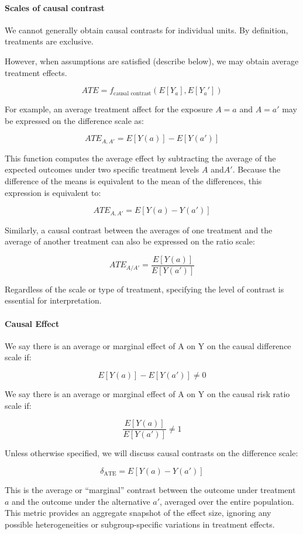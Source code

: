 \documentclass[
  singlecolumn]{article}
\let\oldparagraph\paragraph
\renewcommand{\paragraph}[1]{\oldparagraph{#1}\mbox{}}
\begin{document}
\paragraph{Scales of causal contrast}\label{scales-of-causal-contrast}

We cannot generally obtain causal contrasts for individual units. By
definition, treatments are exclusive.

However, when assumptions are satisfied (describe below), we may obtain
average treatment effects.

\[
ATE = f_{\text{causal contrast}}(E[Y_a], E[Y_a'])
\]

For example, an average treatment affect for the exposure \(A = a\) and
\(A=a'\) may be expressed on the difference scale as:

\[
ATE_{A,A'} = E[Y(a)] - E[Y(a')]
\]

This function computes the average effect by subtracting the average of
the expected outcomes under two specific treatment levels \(A\)
and\(A'\). Because the difference of the means is equivalent to the mean
of the differences, this expression is equivalent to:

\[
ATE_{A,A'} = E[Y(a) - Y(a')]
\]

Similarly, a causal contrast between the averages of one treatment and
the average of another treatment can also be expressed on the ratio
scale:

\[
ATE_{A/A'} = \frac{E[Y(a)]}{E[Y(a')]}
\]

Regardless of the scale or type of treatment, specifying the level of
contrast is essential for interpretation.

\paragraph{Causal Effect}\label{causal-effect}

We say there is an average or marginal effect of A on Y on the causal
difference scale if:

\[ {E}[Y(a)] -  {E}[Y(a')] \neq 0\]

We say there is an average or marginal effect of A on Y on the causal
risk ratio scale if:

\[\frac{ {E}[Y(a)]}{ {E}[Y(a')]}\neq 1\]

Unless otherwise specified, we will discuss causal contrasts on the
difference scale:

\[
\delta_{\text{ATE}} = E[Y(a) - Y(a')]
\]

This is the average or ``marginal'' contrast between the outcome under
treatment \(a\) and the outcome under the alternative \(a'\), averaged
over the entire population. This metric provides an aggregate snapshot
of the effect size, ignoring any possible heterogeneities or
subgroup-specific variations in treatment effects.
\end{document}
